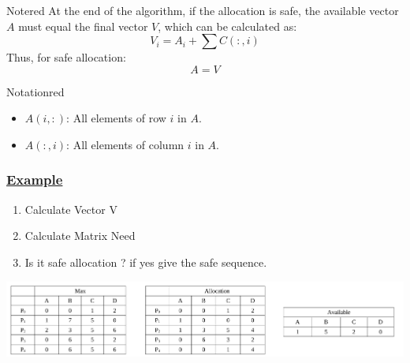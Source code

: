 \vspace{0.25cm}

\begin{prettyBox}{Note}{red}
At the end of the algorithm, if the allocation is safe, the available vector \(A\) must equal the final vector \(V\), which can be calculated as:
\[
V_i = A_i + \sum C(:,i)
\]
Thus, for safe allocation:
\[
A = V
\]
\end{prettyBox}

\vspace{0.25cm}

\begin{prettyBox}{Notation}{red}
\begin{itemize}
    \item \(A(i,:)\): All elements of row \(i\) in \(A\).
    \item \(A(:,i)\): All elements of column \(i\) in \(A\).
\end{itemize}
\end{prettyBox}

\vspace{0.5cm}
\subsubsection*{\underline{Example}}

\vspace{0.1cm}
\begin{enumerate}
    \item Calculate Vector V 
    \item Calculate Matrix Need
    \item Is it safe allocation ? if yes give the safe sequence.
\end{enumerate}

\vspace{0.15cm}
\begin{center}
    \includegraphics[width=\textwidth]{Chapters/Bank/bank.pdf}
\end{center}

